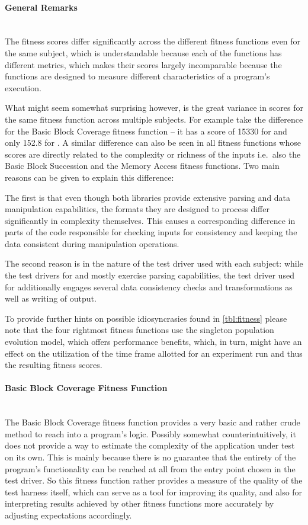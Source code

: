 \paragraph{General Remarks} ~\\
The fitness scores differ significantly across the different fitness functions even for the same subject,
which is understandable because each of the functions has different metrics, which makes their scores
largely incomparable because the functions are designed to measure different characteristics of a
program's execution.

What might seem somewhat surprising however, is the great variance in scores for the same fitness function
across multiple subjects. For example take the difference for the Basic Block Coverage fitness function -- it
has a score of 15330 for \libpng and only 152.8 for \libpcap. 
A similar difference can also be seen in all fitness functions whose scores are directly related to the
complexity or richness of the inputs i.e.\ also the Basic Block Succession and the Memory Access fitness
functions. Two main reasons can be given to explain this difference:

The first is that even though both libraries provide extensive parsing and data manipulation capabilities,
the formats they are designed to process differ significantly in complexity themselves. This causes a
corresponding difference in parts of the code responsible for checking inputs for consistency and keeping
the data consistent during manipulation operations.

The second reason is in the nature of the test driver used with each subject: while the test drivers for
\libpcap and \libxml mostly exercise parsing capabilities, the test driver used for \libpng additionally
engages several data consistency checks and transformations as well as writing of output.

To provide further hints on possible idiosyncrasies found in \cref{tbl:fitness} please note that the four
rightmost fitness functions use the singleton population evolution model, which offers performance benefits,
which, in turn, might have an effect on the utilization of the time frame allotted for an experiment run and
thus the resulting fitness scores.

\paragraph{Basic Block Coverage Fitness Function} ~\\
The Basic Block Coverage fitness function provides a very basic and rather crude method to reach into a
program's logic. Possibly somewhat counterintuitively, it does not provide a way to estimate the complexity of
the application under test on its own. This is mainly because there is no guarantee that the entirety of
the program's functionality can be reached at all from the entry point chosen in the test driver. So this
fitness function rather provides a measure of the quality of the test harness itself, which can serve as a
tool for improving its quality, and also for interpreting results achieved by other fitness functions more
accurately by adjusting expectations accordingly.

